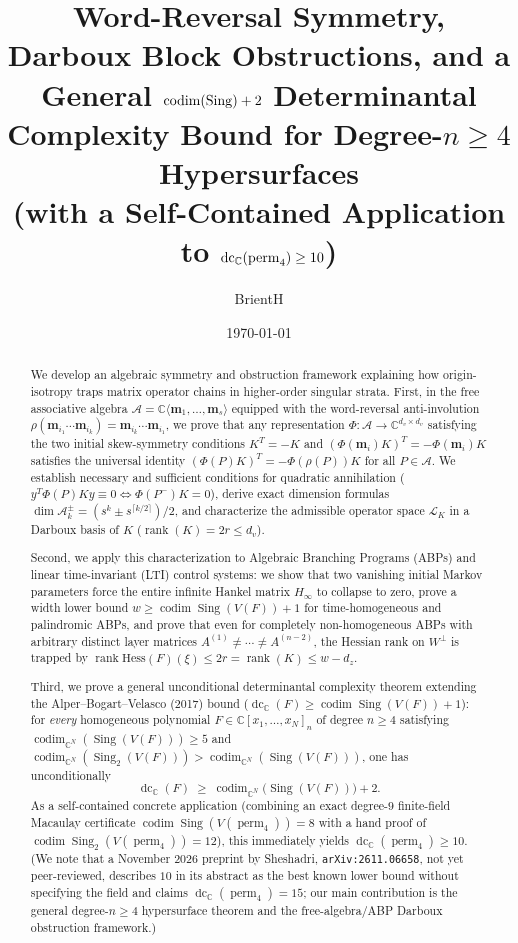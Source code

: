 \documentclass[11pt,a4paper]{article}
\title{Word-Reversal Symmetry, Darboux Block Obstructions, and a General $\codim(\Sing) + 2$ Determinantal Complexity Bound for Degree-$n \ge 4$ Hypersurfaces\\{\large (with a Self-Contained Application to $\dc_{\mathbb{C}}(\perm_4) \ge 10$)}}
\author{BrientH}
\date{\today}
\theoremstyle{definition}
\DeclareMathOperator{\perm}{perm}
\DeclareMathOperator{\dc}{dc}
\DeclareMathOperator{\codim}{codim}
\DeclareMathOperator{\Sing}{Sing}
\DeclareMathOperator{\rank}{rank}
\begin{document}
\maketitle

\begin{abstract}
We develop an algebraic symmetry and obstruction framework explaining how origin-isotropy traps matrix operator chains in higher-order singular strata. First, in the free associative algebra $\mathcal{A} = \mathbb{C}\langle \mathbf{m}_1,\dots,\mathbf{m}_s \rangle$ equipped with the word-reversal anti-involution $\rho(\mathbf{m}_{i_1}\cdots\mathbf{m}_{i_k}) = \mathbf{m}_{i_k}\cdots\mathbf{m}_{i_1}$, we prove that any representation $\Phi : \mathcal{A} \to \mathbb{C}^{d_v\times d_v}$ satisfying the two initial skew-symmetry conditions $K^T = -K$ and $(\Phi(\mathbf{m}_i)K)^T = -\Phi(\mathbf{m}_i)K$ satisfies the universal identity $(\Phi(P)K)^T = -\Phi(\rho(P))K$ for all $P \in \mathcal{A}$. We establish necessary and sufficient conditions for quadratic annihilation ($y^T \Phi(P)K y \equiv 0 \iff \Phi(P^-)K = 0$), derive exact dimension formulas $\dim \mathcal{A}_k^\pm = (s^k \pm s^{\lceil k/2 \rceil})/2$, and characterize the admissible operator space $\mathcal{L}_K$ in a Darboux basis of $K$ ($\rank(K) = 2r \le d_v$).

Second, we apply this characterization to Algebraic Branching Programs (ABPs) and linear time-invariant (LTI) control systems: we show that two vanishing initial Markov parameters force the entire infinite Hankel matrix $H_\infty$ to collapse to zero, prove a width lower bound $w \ge \codim\Sing(V(F)) + 1$ for time-homogeneous and palindromic ABPs, and prove that even for completely non-homogeneous ABPs with arbitrary distinct layer matrices $A^{(1)} \neq \cdots \neq A^{(n-2)}$, the Hessian rank on $W^\perp$ is trapped by $\rank\mathrm{Hess}(F)(\xi) \le 2r = \rank(K) \le w - d_z$.

Third, we prove a general unconditional determinantal complexity theorem extending the Alper--Bogart--Velasco (2017) bound ($\dc_{\mathbb{C}}(F) \ge \codim\Sing(V(F)) + 1$): for \emph{every} homogeneous polynomial $F \in \mathbb{C}[x_1,\dots,x_N]_n$ of degree $n \ge 4$ satisfying $\codim_{\mathbb{C}^N}(\Sing(V(F))) \ge 5$ and $\codim_{\mathbb{C}^N}(\Sing_2(V(F))) > \codim_{\mathbb{C}^N}(\Sing(V(F)))$, one has unconditionally
\[
  \dc_{\mathbb{C}}(F) \;\ge\; \codim_{\mathbb{C}^N}\big(\Sing(V(F))\big) + 2.
\]
As a self-contained concrete application (combining an exact degree-$9$ finite-field Macaulay certificate $\codim\Sing(V(\perm_4)) = 8$ with a hand proof of $\codim\Sing_2(V(\perm_4)) = 12$), this immediately yields $\dc_{\mathbb{C}}(\perm_4) \ge 10$. (We note that a November 2026 preprint by Sheshadri, \texttt{arXiv:2611.06658}, not yet peer-reviewed, describes $10$ in its abstract as the best known lower bound without specifying the field and claims $\dc_{\mathbb{C}}(\perm_4) = 15$; our main contribution is the general degree-$n \ge 4$ hypersurface theorem and the free-algebra/ABP Darboux obstruction framework.)
\end{abstract}
\end{document}
